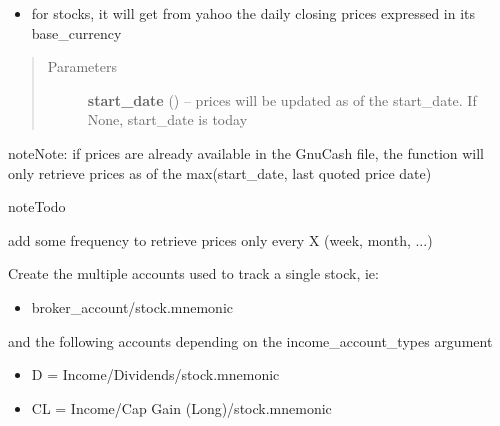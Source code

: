 \documentclass[letterpaper,10pt,english]{sphinxmanual}
\begin{document}
\begin{fulllineitems}
\begin{fulllineitems}
\begin{itemize}
\item {} 
for stocks, it will get from yahoo the daily closing prices expressed in its base\_currency

\end{itemize}
\begin{quote}\begin{description}
\item[{Parameters}] \leavevmode
\textbf{start\_date} (\href{http://docs.python.org/library/datetime.html\#datetime.date}{}) -- prices will be updated as of the start\_date. If None, start\_date is today

\end{description}\end{quote}

\begin{notice}{note}{Note:}
if prices are already available in the GnuCash file, the function will only retrieve prices as of the
max(start\_date, last quoted price date)
\end{notice}

\begin{notice}{note}{Todo}

add some frequency to retrieve prices only every X (week, month, ...)
\end{notice}

\end{fulllineitems}


\begin{fulllineitems}
\label{api/piecash.model_core.commodity:piecash.model_core.commodity.Commodity.create_stock_accounts}
Create the multiple accounts used to track a single stock, ie:
\begin{itemize}
\item {} 
broker\_account/stock.mnemonic

\end{itemize}

and the following accounts depending on the income\_account\_types argument
\begin{itemize}
\item {} 
D = Income/Dividends/stock.mnemonic

\item {} 
CL = Income/Cap Gain (Long)/stock.mnemonic


\end{itemize}
\end{fulllineitems}
\end{fulllineitems}
\end{document}
